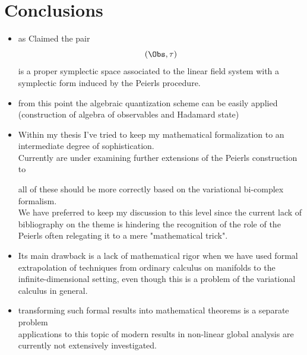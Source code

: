 \documentclass[a4paper,11pt]{scrartcl}
\begin{document}
    \section{Conclusions}
    \begin{itemize}
        \item as Claimed the pair $$(\Obs, \tau)$$ is a proper symplectic space associated to the linear field system with a symplectic form induced by the Peierls procedure.
        \item from this point the algebraic quantization scheme can be easily applied (construction of algebra of observables and Hadamard state)
        \item    Within my thesis I've tried to keep my mathematical formalization to an intermediate degree of sophistication.\\
        Currently are under examining further extensions of the Peierls construction to 
		all of these should be more correctly based on the variational bi-complex formalism. \\
    We have preferred to keep my discussion to this level since the current lack of bibliography on the theme is hindering the recognition of the role of the Peierls often relegating it to a mere "mathematical trick".
        \item Its main drawback is a lack of mathematical rigor when we have used formal extrapolation of techniques from ordinary calculus on manifolds to the infinite-dimensional setting, even though this is a problem of the variational calculus in general.
        \item transforming such formal results into mathematical theorems is a separate problem\\
        applications to this topic of modern results in non-linear global analysis are currently not extensively investigated.
    \end{itemize}

    
\end{document}
